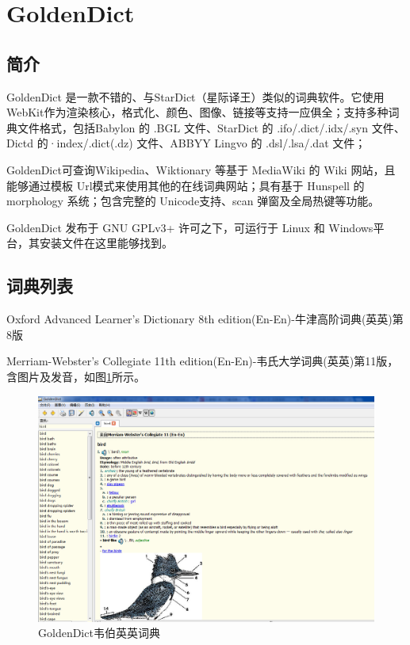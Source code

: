\documentclass[paper=a4,fontsize=11pt]{article}
\begin{document}
	\section{GoldenDict}
	
	\subsection{简介}
	
	GoldenDict 是一款不错的、与StarDict（星际译王）类似的词典软件。它使用 WebKit作为渲染核心，格式化、颜色、图像、链接等支持一应俱全；支持多种词典文件格式，包括Babylon 的 .BGL 文件、StarDict 的 .ifo/.dict/.idx/.syn 文件、Dictd 的·index/.dict(.dz) 文件、ABBYY Lingvo 的 .dsl/.lsa/.dat 文件；
	
	GoldenDict可查询Wikipedia、Wiktionary 等基于 MediaWiki 的 Wiki 网站，且能够通过模板 Url模式来使用其他的在线词典网站；具有基于 Hunspell 的 morphology 系统；包含完整的 Unicode支持、scan 弹窗及全局热键等功能。
	
	GoldenDict 发布于 GNU GPLv3+ 许可之下，可运行于 Linux 和 Windows平台，其安装文件在这里能够找到。
	
	\subsection{词典列表}
	
	Oxford Advanced Learner's Dictionary 8th edition(En-En)-牛津高阶词典(英英)第8版
	
	Merriam-Webster's Collegiate 11th edition(En-En)-韦氏大学词典(英英)第11版，含图片及发音，如图\ref{GoldenDictWebster}所示。    
	
	\begin{figure}[htbp]
		\centering
		\includegraphics[scale=0.35]{GoldenDictWebster.jpg}
		\caption{GoldenDict韦伯英英词典}
		\label{GoldenDictWebster}
	\end{figure}
	
\end{document}
